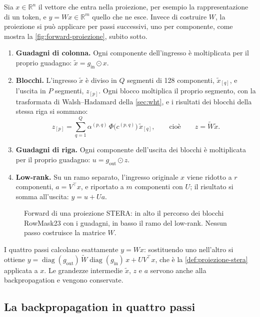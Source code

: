 Sia $x\in\mathbb{R}^n$ il vettore che entra nella proiezione, per esempio la rappresentazione di un token, e $y=Wx\in\mathbb{R}^m$ quello che ne esce. Invece di costruire $W$, la proiezione si può applicare per passi successivi, uno per componente, come mostra la \autoref{fig:forward-proiezione}, subito sotto.
\begin{enumerate}
\item[\textbf{1.}] \textbf{Guadagni di colonna.} Ogni componente dell'ingresso è moltiplicata per il proprio guadagno: $\tilde x = g_{\mathrm{in}}\odot x$.
\item[\textbf{2.}] \textbf{Blocchi.} L'ingresso $\tilde x$ è diviso in $Q$ segmenti di 128 componenti, $\tilde x_{[q]}$, e l'uscita in $P$ segmenti, $z_{[p]}$. Ogni blocco moltiplica il proprio segmento, con la trasformata di Walsh--Hadamard della \autoref{sec:wht}, e i risultati dei blocchi della stessa riga si sommano:
\[
z_{[p]} = \sum_{q=1}^{Q} \alpha^{(p,q)}\,\Phi\big(c^{(p,q)}\big)\,\tilde x_{[q]},\qquad\text{cioè}\qquad z=\widetilde W\tilde x .
\]
\item[\textbf{3.}] \textbf{Guadagni di riga.} Ogni componente dell'uscita dei blocchi è moltiplicata per il proprio guadagno: $u = g_{\mathrm{out}}\odot z$.
\item[\textbf{4.}] \textbf{Low-rank.} Su un ramo separato, l'ingresso originale $x$ viene ridotto a $r$ componenti, $a=V^\top x$, e riportato a $m$ componenti con $U$; il risultato si somma all'uscita: $y = u + U a$.
\end{enumerate}

\begin{figure}[H]
\centering
\resizebox{\linewidth}{!}{}
\caption{Forward di una proiezione STERA: in alto il percorso dei blocchi RowMask23 con i guadagni, in basso il ramo del low-rank. Nessun passo costruisce la matrice $W$.}
\label{fig:forward-proiezione}
\end{figure}

I quattro passi calcolano esattamente $y=Wx$: sostituendo uno nell'altro si ottiene $y=\operatorname{diag}(g_{\mathrm{out}})\,\widetilde W\operatorname{diag}(g_{\mathrm{in}})\,x+UV^\top x$, che è la \autoref{def:proiezione-stera} applicata a $x$. Le grandezze intermedie $\tilde x$, $z$ e $a$ servono anche alla backpropagation e vengono conservate.

\subsection{La backpropagation in quattro passi}
\label{sec:backward-passi}

